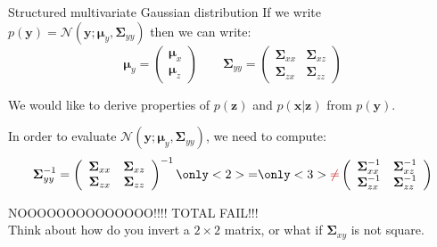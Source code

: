 \documentclass{beamer}
\newcommand{\MN}{{\mathcal N}}
\newcommand{\bs}[1]{\boldsymbol{#1}}
\begin{document}
\begin{frame}{Structured multivariate Gaussian distribution}
 If we write $p(\bs{y}) = \MN(\bs{y};\bs{\mu}_y,\bs{\Sigma}_{yy})$ then we can write:
 \begin{equation*}
  \bs{\mu}_{y}=\left(\begin{array}{c}\bs{\mu}_x\\\bs{\mu}_z\end{array}\right) \qquad
  \bs{\Sigma}_{yy}= \left(\begin{array}{cc} \bs{\Sigma}_{xx} & \bs{\Sigma}_{xz} \\ \bs{\Sigma}_{zx} & \bs{\Sigma}_{zz} \end{array}\right)
 \end{equation*}\vspace{3mm}
 
 We would like to derive properties of $p(\bs{z})$ and $p(\bs{x}|\bs{z})$ from $p(\bs{y})$.\pause

 In order to evaluate $\MN(\bs{y};\bs{\mu}_y,\bs{\Sigma}_{yy})$, we need to compute:
 \begin{equation*}
  \bs{\Sigma}_{yy}^{-1} = \left(\begin{array}{cc} \bs{\Sigma}_{xx} & \bs{\Sigma}_{xz} \\ \bs{\Sigma}_{zx} & \bs{\Sigma}_{zz} \end{array}\right)^{-1} \only<2>{=} {\only<3>{\color{myred}\neq} \left(\begin{array}{cc} \bs{\Sigma}_{xx}^{-1} & \bs{\Sigma}_{xz}^{-1} \\ \bs{\Sigma}_{zx}^{-1} & \bs{\Sigma}_{zz}^{-1} \end{array}\right)}
 \end{equation*}\vspace{3mm}\pause
 
 {\color{myred}\LARGE NOOOOOOOOOOOOOO!!!! TOTAL FAIL!!!}\vspace{3mm}\\
 
 Think about how do you invert a $2\times 2$ matrix, or what if $\bs{\Sigma}_{xy}$ is not square.
\end{frame}
\end{document}
